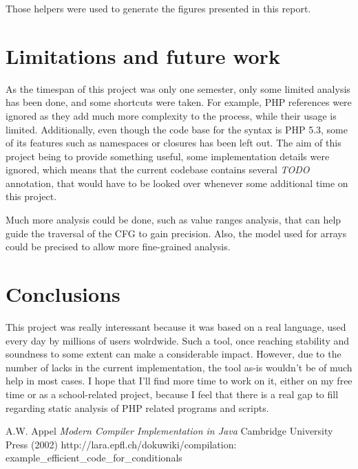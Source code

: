 \documentclass[a4paper]{article}
\begin{document}
Those helpers were used to generate the figures presented in this report.

\section{Limitations and future work}
As the timespan of this project was only one semester, only some limited
analysis has been done, and some shortcuts were taken.  For example, PHP
references were ignored as they add much more complexity to the process, while
their usage is limited. Additionally, even though the code base for the syntax
is PHP 5.3, some of its features such as namespaces or closures has been left
out. The aim of this project being to provide something useful, some implementation
details were ignored, which means that the current codebase contains several
\emph{TODO} annotation, that would have to be looked over whenever some
additional time on this project.

Much more analysis could be done, such as value ranges analysis, that can help
guide the traversal of the CFG to gain precision. Also, the model used for
arrays could be precised to allow more fine-grained analysis.

\section{Conclusions}
This project was really interessant because it was based on a real language, used
every day by millions of users wolrdwide. Such a tool, once reaching stability
and soundness to some extent can make a considerable impact. However, due to the
number of lacks in the current implementation, the tool as-is wouldn't be of
much help in most cases. I hope that I'll find more time to work on it, either
on my free time or as a school-related project, because I feel that there is a
real gap to fill regarding static analysis of PHP related programs and scripts.

\begin{thebibliography}{99}
  A.W. Appel {\it Modern Compiler Implementation in Java}
    Cambridge University Press (2002)
  \mbox{http://lara.epfl.ch/dokuwiki/compilation:} \mbox{example\_efficient\_code\_for\_conditionals}
\end{thebibliography}
\end{document}
